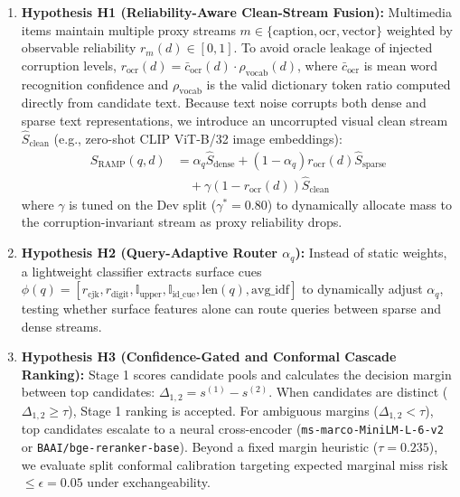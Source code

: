 \documentclass[conference]{IEEEtran}
\begin{document}
\begin{enumerate}
    \setlength{\itemsep}{1pt plus 0.5pt}
    \setlength{\parskip}{0pt}
    \item \textbf{Hypothesis H1 (Reliability-Aware Clean-Stream Fusion):} Multimedia items maintain multiple proxy streams $m \in \{\text{caption}, \text{ocr}, \text{vector}\}$ weighted by observable reliability $r_m(d) \in [0, 1]$. To avoid oracle leakage of injected corruption levels, $r_{\text{ocr}}(d) = \bar{c}_{\text{ocr}}(d) \cdot \rho_{\text{vocab}}(d)$, where $\bar{c}_{\text{ocr}}$ is mean word recognition confidence and $\rho_{\text{vocab}}$ is the valid dictionary token ratio computed directly from candidate text. Because text noise corrupts both dense and sparse text representations, we introduce an uncorrupted visual clean stream $\hat{S}_{\text{clean}}$ (e.g., zero-shot CLIP ViT-B/32 image embeddings):
    \begin{equation}
    \begin{aligned}
        S_{\text{RAMP}}(q, d) &= \alpha_q \hat{S}_{\text{dense}} + (1 - \alpha_q) r_{\text{ocr}}(d) \hat{S}_{\text{sparse}} \\
        &\quad + \gamma (1 - r_{\text{ocr}}(d)) \hat{S}_{\text{clean}}
    \end{aligned}
    \label{eq:ramp}
    \end{equation}
    where $\gamma$ is tuned on the Dev split ($\gamma^* = 0.80$) to dynamically allocate mass to the corruption-invariant stream as proxy reliability drops.
    \item \textbf{Hypothesis H2 (Query-Adaptive Router $\alpha_q$):} Instead of static weights, a lightweight classifier extracts surface cues $\phi(q) = [r_{\text{cjk}}, r_{\text{digit}}, \mathbb{I}_{\text{upper}}, \mathbb{I}_{\text{id\_cue}}, \text{len}(q), \text{avg\_idf}]$ to dynamically adjust $\alpha_q$, testing whether surface features alone can route queries between sparse and dense streams.
    \item \textbf{Hypothesis H3 (Confidence-Gated and Conformal Cascade Ranking):} Stage 1 scores candidate pools and calculates the decision margin between top candidates: $\Delta_{1,2} = s^{(1)} - s^{(2)}$. When candidates are distinct ($\Delta_{1,2} \ge \tau$), Stage 1 ranking is accepted. For ambiguous margins ($\Delta_{1,2} < \tau$), top candidates escalate to a neural cross-encoder (\texttt{ms-marco-MiniLM-L-6-v2} or \texttt{BAAI/bge-reranker-base}). Beyond a fixed margin heuristic ($\tau = 0.235$), we evaluate split conformal calibration targeting expected marginal miss risk $\le \epsilon = 0.05$ under exchangeability.
\end{enumerate}
\end{document}
